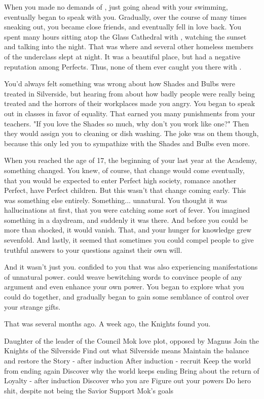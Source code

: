 \documentclass[char]{Silversiders}
\begin{document}
When you made no demands of \cWisdom{\them}, just going ahead with your swimming, eventually \cWisdom{} began to speak with you. Gradually, over the course of many times sneaking out, you became close friends, and eventually \cWisdom{\they} fell in love back. You spent many hours sitting atop the Glass Cathedral with \cWisdom{\them}, watching the sunset and talking into the night. That was where \cWisdom{\they} and several other homeless members of the underclass slept at night. It was a beautiful place, but had a negative reputation among Perfects. Thus, none of them ever caught you there with \cWisdom{}.

You'd always felt something was wrong about how Shades and Bulbs were treated in Silverside, but hearing from \cWisdom{} about how badly people were really being treated and the horrors of their workplaces made you angry. You began to speak out in classes in favor of equality. That earned you many punishments from your teachers. "If you love the Shades so much, why don't you work like one?" Then they would assign you to cleaning or dish washing. The joke was on them though, because this only led you to sympathize with the Shades and Bulbs even more.

When you reached the age of 17, the beginning of your last year at the Academy, something changed. You knew, of course, that change would come eventually, that you would be expected to enter Perfect high society, romance another Perfect, have Perfect children. But this wasn't that change coming early. This was something else entirely. Something... unnatural. You thought it was hallucinations at first, that you were catching some sort of fever. You imagined something in a daydream, and suddenly it was there. And before you could be more than shocked, it would vanish. That, and your hunger for knowledge grew sevenfold. And lastly, it seemed that sometimes you could compel people to give truthful answers to your questions against their own will.

And it wasn't just you. \cWisdom{} confided to you that \cWisdom{\they} was also experiencing manifestations of unnatural power. \cWisdom{\They} could weave bewitching words to convince people of any argument and even enhance your own power. You began to explore what you could do together, and gradually began to gain some semblance of control over your strange gifts. 

That was several months ago. A week ago, the Knights found you.

Daughter of the leader of the Council
Mok love plot, opposed by Magnus
Join the Knights of the Silverside
Find out what Silverside means
Maintain the balance and restore the Story - after induction
After induction - recruit
Keep the world from ending again
Discover why the world keeps ending
Bring about the return of Loyalty - after induction
Discover who you are
Figure out your powers
Do hero shit, despite not being the Savior
Support Mok's goals
\end{document}
